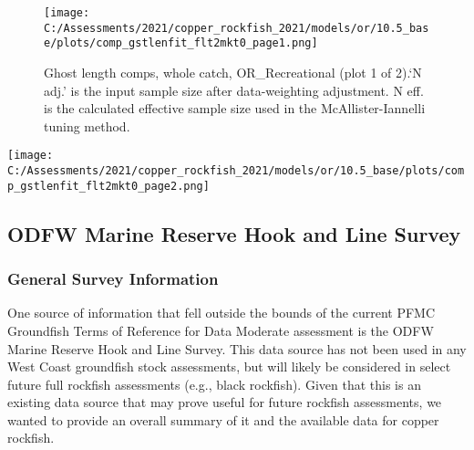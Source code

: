 \documentclass[11pt,
  english,
  a4paper,
]{article}
\begin{document}

\begin{figure}
\centering
\texttt{[image: C:/Assessments/2021/copper\_rockfish\_2021/models/or/10.5\_base/plots/comp\_gstlenfit\_flt2mkt0\_page1.png]}
\caption{Ghost length comps, whole catch, OR\_Recreational (plot 1 of 2).`N adj.' is the input sample size after data-weighting adjustment. N eff. is the calculated effective sample size used in the McAllister-Iannelli tuning method.\label{fig:comp_gstlenfit_flt2mkt0_page1}}
\end{figure}

\tagmcend\tagstructend


\texttt{[image: C:/Assessments/2021/copper\_rockfish\_2021/models/or/10.5\_base/plots/comp\_gstlenfit\_flt2mkt0\_page2.png]} \clearpage

\tagmcend\tagstructend


\hypertarget{append-survey}{%
\subsection{ODFW Marine Reserve Hook and Line Survey}\label{append-survey}}

\leavevmode\tagmcend\tagstructend


\hypertarget{general-survey-information}{%
\subsubsection{General Survey Information}\label{general-survey-information}}

\leavevmode\tagmcend\tagstructend


One source of information that fell outside the bounds of the current PFMC Groundfish Terms of Reference for Data Moderate assessment is the ODFW Marine Reserve Hook and Line Survey. This data source has not been used in any West Coast groundfish stock assessments, but will likely be considered in select future full rockfish assessments (e.g., black rockfish). Given that this is an existing data source that may prove useful for future rockfish assessments, we wanted to provide an overall summary of it and the available data for copper rockfish.
\end{document}
